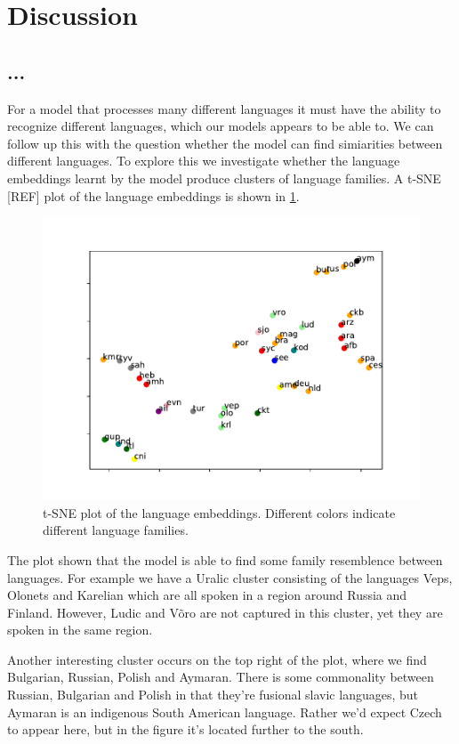 \documentclass[11pt,a4paper]{article}
\begin{document}
\section{Discussion}

\subsection{...}

For a model that processes many different languages it must have the
ability to recognize different languages, which our models appears to
be able to. We can follow up this with the question whether the model
can find simiarities between different languages. To explore this we
investigate whether the language embeddings learnt by the model
produce clusters of language families. A t-SNE [REF] plot of the
language embeddings is shown in \cref{fig:lang_tsne}.

\begin{figure}[ht]
\centering
\includegraphics[scale=0.5]{lang_tsne.pdf}
\caption{\label{fig:lang_tsne} t-SNE plot of the language
embeddings. Different colors indicate different language families.}
\end{figure}

The plot shown that the model is able to find some family resemblence
between languages. For example we have a Uralic cluster consisting of
the languages Veps, Olonets and Karelian which are all spoken in a
region around Russia and Finland. However, Ludic and V\~{o}ro are not
captured in this cluster, yet they are spoken in the same region.

Another interesting cluster occurs on the top right of the plot, where
we find Bulgarian, Russian, Polish and Aymaran. There is some
commonality between Russian, Bulgarian and Polish in that they're
fusional slavic languages, but Aymaran is an indigenous South American
language. Rather we'd expect Czech to appear here, but in the figure
it's located further to the south.
\end{document}
